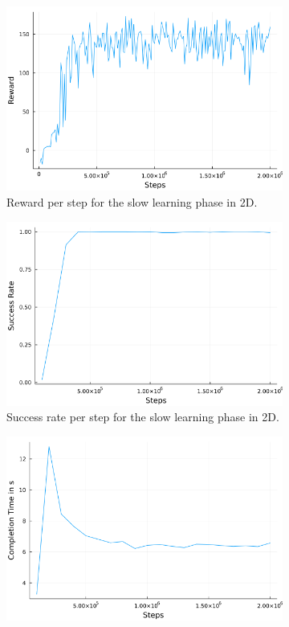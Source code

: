 \begin{figure}[t]
\centering
\begin{subfigure}[htb!]{0.3\textwidth}
    \includegraphics[width=\textwidth]{images/Reward_slow.png}
    \caption{Reward per step for the slow learning phase in 2D.}
    \label{fig:reward_slow}
\end{subfigure}
\hfill
\begin{subfigure}[htb!]{0.3\textwidth}
    \includegraphics[width=\textwidth]{images/Success_slow.png}
    \caption{Success rate per step for the slow learning phase in 2D.}
    \label{fig:success_slow}
\end{subfigure}
\hfill
\begin{subfigure}[htb!]{0.3\textwidth}
    \includegraphics[width=\textwidth]{images/Time_slow.png}

\end{subfigure}
\end{figure}
